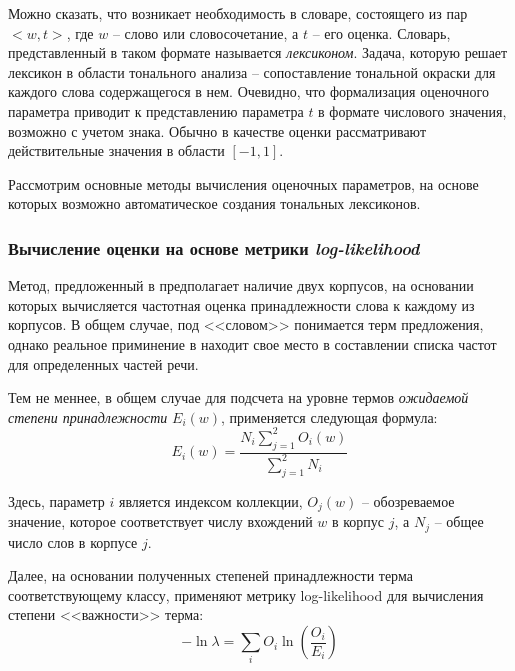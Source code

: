     Можно сказать, что возникает необходимость в словаре, состоящего из пар
    $<w, t>$, где $w$ -- слово или словосочетание, а $t$ -- его оценка.
    Словарь, представленный в таком формате называется {\it лексиконом}.
    Задача, которую решает лексикон в области тонального анализа -- сопоставление
    тональной окраски для каждого слова содержащегося в нем.
    Очевидно, что формализация оценочного параметра приводит к представлению
    параметра $t$ в формате числового значения, возможно с учетом знака.
    Обычно в качестве оценки рассматривают действительные значения в области
    $\left[ -1, 1\right]$.

    Рассмотрим основные методы вычисления оценочных параметров, на основе которых
    возможно автоматическое создания тональных лексиконов.

        \subsubsection{Вычисление оценки на основе метрики {\it log-likelihood}}
        Метод, предложенный в \cite{lexiconLL} предполагает наличие двух корпусов, на основании
        которых вычисляется частотная оценка принадлежности слова к каждому из корпусов.
        В общем случае, под <<словом>> понимается терм предложения, однако
        реальное приминение в \cite{lexiconLL} находит свое место в составлении
        списка частот для определенных частей речи.

        Тем не меннее, в общем случае для подсчета на уровне термов {\it ожидаемой
        степени принадлежности} $E_i(w)$, применяется следующая формула:
        \begin{equation}
            \label{eq:classDifference}
            E_i(w) = \dfrac{N_i\sum\limits_{j=1}^{2}O_i(w)}{\sum\limits_{j=1}^{2}N_i}
        \end{equation}

        Здесь, параметр $i$ является индексом коллекции, $O_j(w)$ -- обозреваемое
        значение, которое соответствует числу вхождений $w$ в корпус $j$, а $N_j$
        -- общее число слов в корпусе $j$.

        Далее, на основании полученных степеней принадлежности терма соответствующему
        классу, применяют метрику log-likelihood для вычисления степени <<важности>>
        терма:
        \begin{equation}
            \label{eq:loglikelihood}
            - \ln \lambda = \sum\limits_i O_i \ln \left( \dfrac{O_i}{E_i} \right)
        \end{equation}


